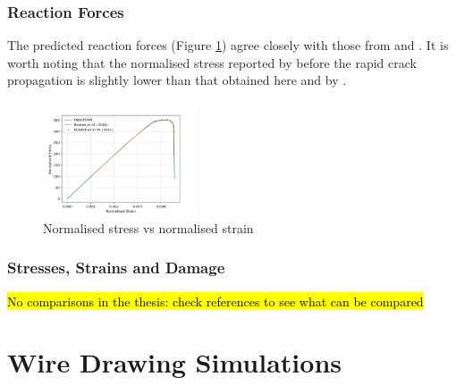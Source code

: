 \documentclass[sn-mathphys,Numbered,draft]{sn-jnl}%
\begin{document}
\subsubsection{Reaction Forces}

The predicted reaction forces (Figure \ref{fig:phaseFieldForce}) agree closely with those from \citet{borden_phase-field_2016} and \citet{eldahshan_phase_2021}. 
It is worth noting that the normalised stress reported by \citet{borden_phase-field_2016} before the rapid crack propagation is slightly lower than that obtained here and by \citet{eldahshan_phase_2021}.
\begin{figure}[htb]
\begin{center}
	\includegraphics[width=0.4\textwidth]{./Figures/phaseCompare.png}
\caption{Normalised stress vs normalised strain}
\label{fig:phaseFieldForce}
\end{center}
\end{figure}


\subsubsection{Stresses, Strains and Damage}

\hl{No comparisons in the thesis: check references to see what can be compared}


\section{Wire Drawing Simulations}
\end{document}
